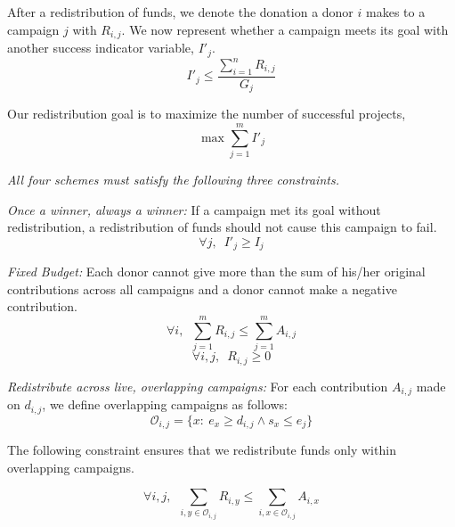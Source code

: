 After a redistribution of funds, we denote the donation a donor $i$ makes to a campaign $j$ with $R_{i, j}$. We now represent whether a campaign meets its goal with another success indicator variable, $I'_j$.
\[I'_j \leq \frac{\sum_{i = 1}^{n} R_{i, j}}{G_j}
\] 

Our redistribution goal is to maximize the number of successful projects,
\[\max \sum_{j = 1}^{m} I'_j \]

\textit{All four schemes must satisfy the following three constraints.} 

\begin{enumerate}[label={[\bf\sc{All\arabic*}]},wide =1em]
\item \emph{Once a winner, always a winner:} If a campaign met its goal without redistribution, a redistribution of funds should not cause this campaign to fail. 
\[\forall j, \;\ I'_j \geq I_j \]

\item \emph{Fixed Budget:} Each donor cannot give more than the sum of his/her original contributions across all campaigns and a donor cannot make a negative contribution.
\[ \forall i, \;\ \sum_{j = 1}^{m} R_{i,j} \leq \sum_{j = 1}^{m} A_{i,j}\]
\[\forall i,j, \;\ R_{i, j} \geq 0\]

\item \emph{Redistribute across live, overlapping campaigns:}
For each contribution $A_{i, j}$ made on $d_{i,j}$, we define overlapping campaigns as follows:
\[\mathcal{O}_{i, j} = \{x : \ e_x \geq d_{i, j} \wedge s_x \leq e_j \}\]





The following constraint ensures that we redistribute funds only within overlapping campaigns.

\[\forall i,j, \;\ \sum_{i, y \in \mathcal{O}_{i, j}} R_{i, y} \leq \sum_{i, x \in \mathcal{O}_{i, j}} A_{i, x}\]


\end{enumerate}

